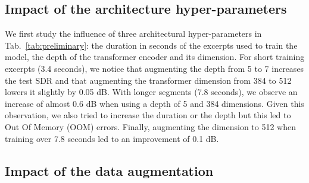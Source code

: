 \documentclass{article}
\begin{document}
\subsection{Impact of the architecture hyper-parameters}
\label{sec:hyperparams}

We first study the influence of three architectural hyper-parameters in Tab.~\ref{tab:preliminary}: the duration in seconds of the excerpts used to train the model, the depth of the transformer encoder and its dimension.
For short training excerpts (3.4 seconds), we notice that augmenting the depth from 5 to 7 increases the test SDR and that augmenting the transformer dimension from 384 to 512 lowers it slightly by 0.05 dB. With longer segments (7.8 seconds), we observe an increase of almost 0.6 dB when using a depth of 5 and 384 dimensions. Given this observation, we also tried to increase the duration or the depth but this led to Out Of Memory (OOM) errors. Finally, augmenting the dimension to 512 when training over 7.8 seconds led to an improvement of 0.1 dB. 



\subsection{Impact of the data augmentation}
\label{sec:data_augment}
\end{document}
